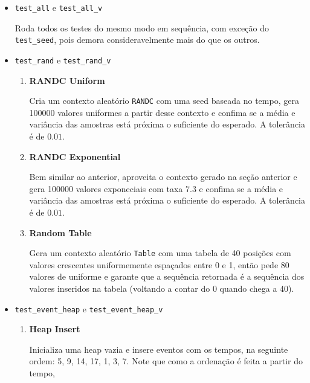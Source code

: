 \documentclass[a4paper]{article}
\newcommand{\inlcode}{\texttt}
\begin{document}
\begin{itemize}
    \item \inlcode{test\_all} e \inlcode{test\_all\_v} \par
        Roda todos os testes do mesmo modo em sequência,
        com exceção do \inlcode{test\_seed},
        pois demora consideravelmente mais do que os outros.
    \item \inlcode{test\_rand} e \inlcode{test\_rand\_v} \par
        \begin{enumerate}
            \item \textbf{RANDC Uniform} \par
                Cria um contexto aleatório \inlcode{RANDC}
                com uma seed baseada no tempo,
                gera 100000 valores uniformes
                a partir desse contexto
                e confima se a média e variância das amostras
                está próxima o suficiente do esperado.
                A tolerância é de \(0.01\).
            \item \textbf{RANDC Exponential} \par
                Bem similar ao anterior,
                aproveita o contexto gerado na seção anterior
                e gera 100000 valores exponeciais com taxa \(7.3\)
                e confima se a média e variância das amostras
                está próxima o suficiente do esperado.
                A tolerância é de \(0.01\).
            \item \textbf{Random Table} \par
                Gera um contexto aleatório \inlcode{Table}
                com uma tabela de 40 posições com valores
                crescentes uniformemente espaçados entre 0 e 1,
                então pede 80 valores de uniforme e
                garante que a sequência retornada é
                a sequência dos valores inseridos na tabela
                (voltando a contar do 0 quando chega a 40).
        \end{enumerate}
    \item \inlcode{test\_event\_heap} e \inlcode{test\_event\_heap\_v}
        \begin{enumerate}
            \item \textbf{Heap Insert} \par
                Inicializa uma heap vazia e
                insere eventos com os tempos,
                na seguinte ordem: 5, 9, 14, 17, 1, 3, 7.
                Note que como a ordenação é feita a partir do tempo,

\end{enumerate}
\end{itemize}
\end{document}
